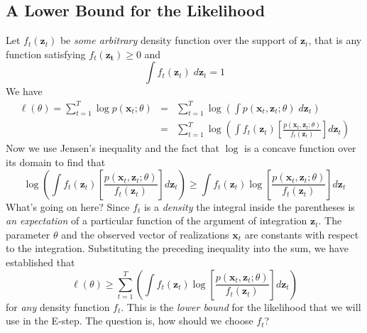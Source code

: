 \subsection{A Lower Bound for the Likelihood}
Let $f_t(\mathbf{z}_t)$ be \emph{some arbitrary} density function over the support of $\mathbf{z}_t$, that is any function satisfying $f_t(\mathbf{z_t})\geq 0$ and
	$$\int f_t(\textbf{z}_t) \;d \textbf{z}_t = 1$$
We have
	\begin{eqnarray*}
		 \ell(\theta) = \sum_{t=1}^T \log p(\textbf{x}_t;\theta) &=& \sum_{t=1}^T \log \left(\int p(\textbf{x}_t,	\textbf{z}_t;\theta)\; d \textbf{z}_t \right)\\
		 	&=&  \sum_{t=1}^T \log \left(\int f_t(\mathbf{z}_t) \left[\frac{p(\textbf{x}_t,	\textbf{z}_t;\theta)}{f_t(\mathbf{z}_t)}\right] d \textbf{z}_t \right)
	\end{eqnarray*}
Now we use Jensen's inequality and the fact that $\log$ is a concave function over its domain to find that
	$$\log \left(\int f_t(\mathbf{z}_t) \left[\frac{p(\textbf{x}_t,	\textbf{z}_t;\theta)}{f_t(\mathbf{z}_t)}\right] d \textbf{z}_t \right) \geq \int f_t(\mathbf{z}_t) \log\left[\frac{p(\textbf{x}_t,\textbf{z}_t;\theta)}{f_t(\mathbf{z}_t)}\right] d \textbf{z}_t $$
What's going on here? Since $f_t$ is a \emph{density} the integral inside the parentheses is \emph{an expectation} of a particular function of the argument of integration $\mathbf{z}_t$. The parameter $\theta$ and the observed vector of realizations $\mathbf{x}_t$ are constants with respect to the integration. Substituting the preceding inequality into the sum, we have established that
	$$\ell(\theta) \geq \sum_{t=1}^T \left(\int f_t(\mathbf{z}_t) \log\left[\frac{p(\textbf{x}_t,\textbf{z}_t;\theta)}{f_t(\mathbf{z}_t)}\right] d \textbf{z}_t \right)$$
for \emph{any} density function $f_t$. This is the \emph{lower bound} for the likelihood that we will use in the E-step. The question is, how should we choose $f_t$? 

